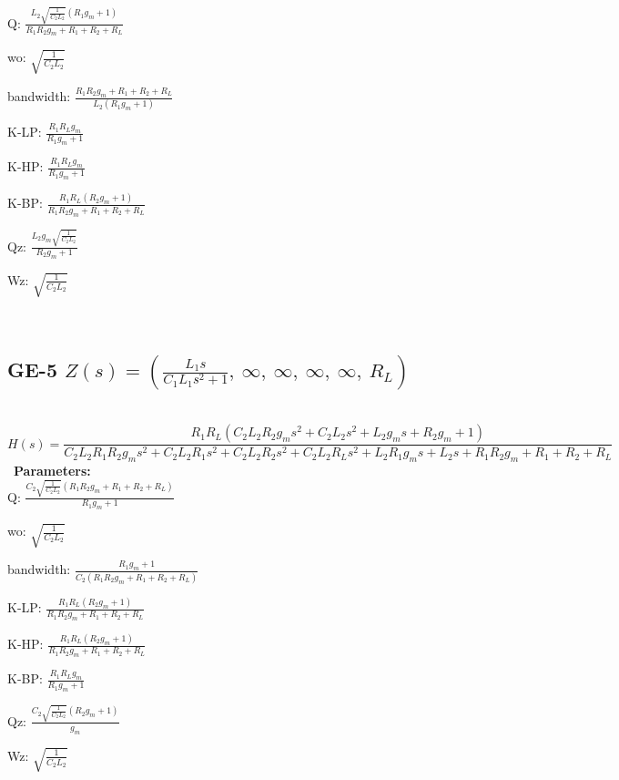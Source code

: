 \documentclass{article}
\begin{document}
Q: $\frac{L_{2} \sqrt{\frac{1}{C_{2} L_{2}}} \left(R_{1} g_{m} + 1\right)}{R_{1} R_{2} g_{m} + R_{1} + R_{2} + R_{L}}$\ 

wo: $\sqrt{\frac{1}{C_{2} L_{2}}}$\ 

bandwidth: $\frac{R_{1} R_{2} g_{m} + R_{1} + R_{2} + R_{L}}{L_{2} \left(R_{1} g_{m} + 1\right)}$\ 

K-LP: $\frac{R_{1} R_{L} g_{m}}{R_{1} g_{m} + 1}$\ 

K-HP: $\frac{R_{1} R_{L} g_{m}}{R_{1} g_{m} + 1}$\ 

K-BP: $\frac{R_{1} R_{L} \left(R_{2} g_{m} + 1\right)}{R_{1} R_{2} g_{m} + R_{1} + R_{2} + R_{L}}$\ 

Qz: $\frac{L_{2} g_{m} \sqrt{\frac{1}{C_{2} L_{2}}}}{R_{2} g_{m} + 1}$\ 

Wz: $\sqrt{\frac{1}{C_{2} L_{2}}}$\ 

\ 

\subsection{GE-5 $Z(s) = \left( \frac{L_{1} s}{C_{1} L_{1} s^{2} + 1}, \  \infty, \  \infty, \  \infty, \  \infty, \  R_{L}\right)$ } \ 
\textbf{\[H(s) = \frac{R_{1} R_{L} \left(C_{2} L_{2} R_{2} g_{m} s^{2} + C_{2} L_{2} s^{2} + L_{2} g_{m} s + R_{2} g_{m} + 1\right)}{C_{2} L_{2} R_{1} R_{2} g_{m} s^{2} + C_{2} L_{2} R_{1} s^{2} + C_{2} L_{2} R_{2} s^{2} + C_{2} L_{2} R_{L} s^{2} + L_{2} R_{1} g_{m} s + L_{2} s + R_{1} R_{2} g_{m} + R_{1} + R_{2} + R_{L}}\] } \ 
\textbf{Parameters:}\\ 

Q: $\frac{C_{2} \sqrt{\frac{1}{C_{2} L_{2}}} \left(R_{1} R_{2} g_{m} + R_{1} + R_{2} + R_{L}\right)}{R_{1} g_{m} + 1}$\ 

wo: $\sqrt{\frac{1}{C_{2} L_{2}}}$\ 

bandwidth: $\frac{R_{1} g_{m} + 1}{C_{2} \left(R_{1} R_{2} g_{m} + R_{1} + R_{2} + R_{L}\right)}$\ 

K-LP: $\frac{R_{1} R_{L} \left(R_{2} g_{m} + 1\right)}{R_{1} R_{2} g_{m} + R_{1} + R_{2} + R_{L}}$\ 

K-HP: $\frac{R_{1} R_{L} \left(R_{2} g_{m} + 1\right)}{R_{1} R_{2} g_{m} + R_{1} + R_{2} + R_{L}}$\ 

K-BP: $\frac{R_{1} R_{L} g_{m}}{R_{1} g_{m} + 1}$\ 

Qz: $\frac{C_{2} \sqrt{\frac{1}{C_{2} L_{2}}} \left(R_{2} g_{m} + 1\right)}{g_{m}}$\ 

Wz: $\sqrt{\frac{1}{C_{2} L_{2}}}$\ 
\end{document}
